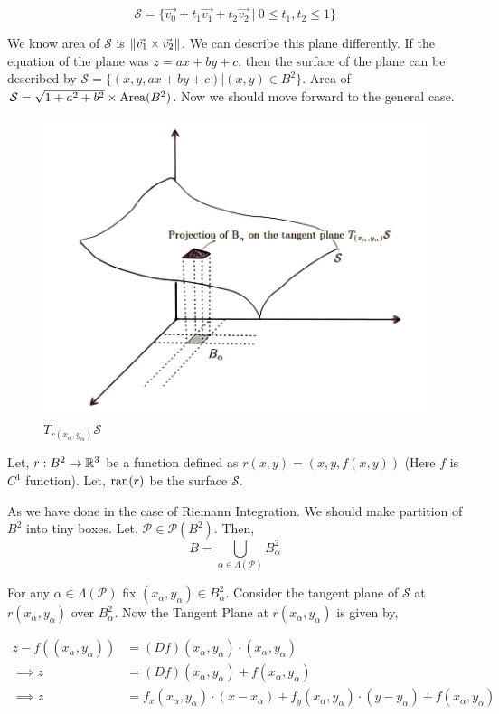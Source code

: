 \documentclass[../Analysis-3.tex]{subfiles}
\begin{document}
$$ \mathcal{S} = \{ \vec{v_0} + t_1 \vec{v_1} +t_2 \vec{v_2} \ | \ 0 \le t_1,t_2 \le 1\} $$

We know area of $\mathcal{S}$ is $\norm{\vec{v_1}\times \vec{v_2}}$. We can describe this plane differently. If the equation of the plane was $z=ax+by+c$, then the surface of the plane can be described by $\mathcal{S} = \{(x, y, ax+by+c) | (x,y) \in B^2 \}$. Area of $\mathcal{S} = \sqrt{1+a^2+b^2} \times \operatorname{Area}(B^2)$. Now we should move forward to the general case.

\begin{figure}
  \centering
  \includegraphics[width=.78\linewidth]{../figures/lec-25.2.png}
  \caption{$T_{r(x_{\alpha},y_{\alpha})} \mathcal{S}$}
\end{figure}


Let, $r : B^2 \to \mathbb{R}^3$ be a function defined as $r(x,y) = (x,y,f(x,y))$ (Here $f$ is $C^1$ function). Let, $\operatorname{ran}(r)$ be the surface $\mathcal{S}$.

\vspace{0.2cm}

As we have done in the case of Riemann Integration. We should make partition of $B^2$ into tiny boxes.  Let, $\mathcal{P} \in \mathscr{P}(B^2)$. Then,
\[B = \bigcup_{\alpha \in \Lambda(\mathcal{P})} B_{\alpha}^2\]

For any $\alpha \in \Lambda(\mathcal{P})$ fix $(x_{\alpha},y_{\alpha}) \in B_{\alpha}^2$. Consider the tangent plane of $\mathcal{S}$ at $r(x_{\alpha},y_{\alpha})$ over $B_{\alpha}^2$. Now the Tangent Plane at $r(x_{\alpha},y_{\alpha})$ is given by,

\begin{align*}
  z - f((x_{\alpha},y_{\alpha})) & = (Df)(x_{\alpha},y_{\alpha}) \cdot (x_{\alpha},y_{\alpha})                                                                       \\
  \implies z                     & = (Df)(x_{\alpha},y_{\alpha}) + f(x_{\alpha},y_{\alpha})                                                                          \\
  \implies z                     & = f_x(x_{\alpha},y_{\alpha}) \cdot (x - x_{\alpha}) +f_y(x_{\alpha},y_{\alpha}) \cdot (y - y_{\alpha}) + f(x_{\alpha},y_{\alpha}) \\
\end{align*}
\end{document}
